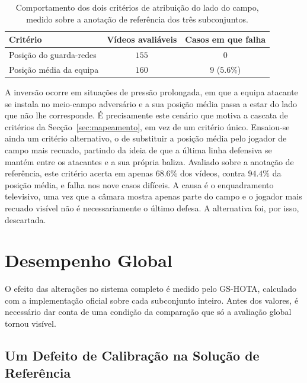 \begin{table}[htbp]
    \centering
    \caption{Comportamento dos dois critérios de atribuição do lado do campo, medido sobre a anotação de referência dos três subconjuntos.}
    \label{tab:lado-inversoes}
    \begin{tabular}{|l|c|c|}
        \hline
        \textbf{Critério} & \textbf{Vídeos avaliáveis} & \textbf{Casos em que falha} \\
        \hline
        Posição do guarda-redes  & $155$ & $0$ \\
        \hline
        Posição média da equipa  & $160$ & $9$ ($5.6\%$) \\
        \hline
    \end{tabular}
\end{table}

A inversão ocorre em situações de pressão prolongada, em que a equipa atacante se instala no meio-campo adversário e a sua posição média passa a estar do lado que não lhe corresponde. É precisamente este cenário que motiva a cascata de critérios da Secção~\ref{sec:mapeamento}, em vez de um critério único. Ensaiou-se ainda um critério alternativo, o de substituir a posição média pelo jogador de campo mais recuado, partindo da ideia de que a última linha defensiva se mantém entre os atacantes e a sua própria baliza. Avaliado sobre a anotação de referência, este critério acerta em apenas $68.6\%$ dos vídeos, contra $94.4\%$ da posição média, e falha nos nove casos difíceis. A causa é o enquadramento televisivo, uma vez que a câmara mostra apenas parte do campo e o jogador mais recuado visível não é necessariamente o último defesa. A alternativa foi, por isso, descartada.

\section{Desempenho Global}\label{sec:desempenho_global}\label{sec:desempenho-global}

O efeito das alterações no sistema completo é medido pelo GS-HOTA, calculado com a implementação oficial sobre cada subconjunto inteiro. Antes dos valores, é necessário dar conta de uma condição da comparação que só a avaliação global tornou visível.

\subsection{Um Defeito de Calibração na Solução de Referência}\label{sec:res_calib_defeito}

